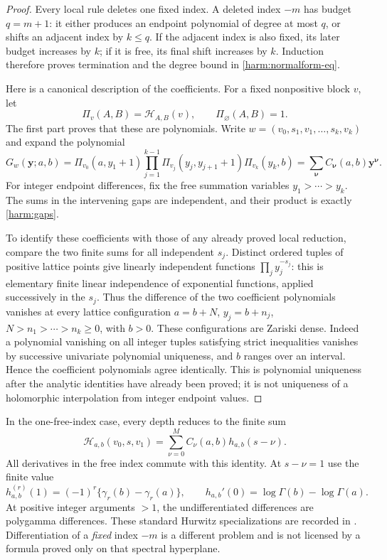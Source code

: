 \begin{proof}
Every local rule deletes one fixed index. A deleted index $-m$ has
budget $q=m+1$: it either produces an endpoint polynomial of degree
at most $q$, or shifts an adjacent index by $k\le q$. If the adjacent
index is also fixed, its later budget increases by $k$; if it is free,
its final shift increases by $k$. Induction therefore proves termination
and the degree bound in \eqref{harm:normalform-eq}.

Here is a canonical description of the coefficients. For a fixed
nonpositive block $v$, let
\[
 \Pi_v(A,B)=\mathcal H_{A,B}(v),\qquad \Pi_{\varnothing}(A,B)=1.
\]
The first part proves that these are polynomials. Write
$w=(v_0,s_1,v_1,\ldots,s_k,v_k)$ and expand the polynomial
\begin{equation}
 G_w(\boldsymbol y;a,b)=
   \Pi_{v_0}(a,y_1+1)
   \prod_{j=1}^{k-1}\Pi_{v_j}(y_j,y_{j+1}+1)
   \Pi_{v_k}(y_k,b)
   =\sum_{\boldsymbol\nu}C_{\boldsymbol\nu}(a,b)
                                 \boldsymbol y^{\boldsymbol\nu}.
 \label{harm:gaps}
\end{equation}
For integer endpoint differences, fix the free summation variables
$y_1>\cdots>y_k$. The sums in the intervening gaps are independent,
and their product is exactly \eqref{harm:gaps}.

To identify these coefficients with those of any already proved local
reduction, compare the two finite sums for all independent $s_j$.
Distinct ordered tuples of positive lattice points give linearly
independent functions $\prod_j y_j^{-s_j}$: this is elementary finite
linear independence of exponential functions, applied successively
in the $s_j$. Thus the difference of the two coefficient polynomials
vanishes at every lattice configuration
$a=b+N$, $y_j=b+n_j$, $N>n_1>\cdots>n_k\ge0$, with $b>0$.
These configurations are Zariski dense. Indeed a polynomial vanishing
on all integer tuples satisfying strict inequalities vanishes by
successive univariate polynomial uniqueness, and $b$ ranges over an
interval. Hence the coefficient polynomials agree identically.
This is polynomial uniqueness after the analytic identities have
already been proved; it is not uniqueness of a holomorphic interpolation
from integer endpoint values.
\end{proof}

In the one-free-index case, every depth reduces to the finite sum
\begin{equation}
           \mathcal H_{a,b}(v_0,s,v_1)
              =\sum_{\nu=0}^M C_\nu(a,b)h_{a,b}(s-\nu).
 \label{harm:onefree}
\end{equation}
All derivatives in the free index commute with this identity. At
$s-\nu=1$ use the finite value
\begin{equation}
 h_{a,b}^{(r)}(1)=(-1)^r\{\gamma_r(b)-\gamma_r(a)\},
 \qquad
 h_{a,b}'(0)=\log\Gamma(b)-\log\Gamma(a).
 \label{harm:jets}
\end{equation}
At positive integer arguments $>1$, the undifferentiated differences
are polygamma differences. These standard Hurwitz specializations are
recorded in \cite{DLMF}. Differentiation of a \emph{fixed}
index $-m$ is a different problem and is not licensed by a formula
proved only on that spectral hyperplane.

